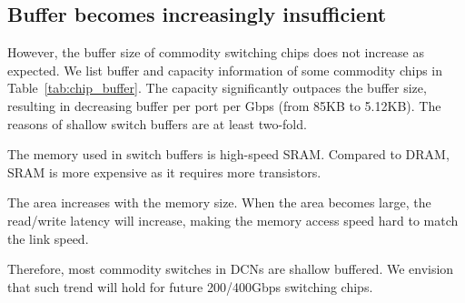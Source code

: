 \subsection{Buffer becomes increasingly insufficient}\label{sec:buffersize}
However, the buffer size of commodity switching chips does not increase as expected. We list buffer and capacity information of some commodity chips in Table~\ref{tab:chip_buffer}. The capacity significantly outpaces the buffer size, resulting in decreasing buffer per port per Gbps (from 85KB to 5.12KB). The reasons of shallow switch buffers are at least two-fold.
\begin{ecompact}
\item The memory used in switch buffers is high-speed SRAM. Compared to DRAM, SRAM is more expensive as it requires more transistors.
\vspace{-1mm}
\item The area increases with the memory size. When the area becomes large, the read/write latency will increase, making the memory access speed hard to match the link speed.
\end{ecompact}
Therefore, most commodity switches in DCNs are shallow buffered. We envision that such trend will hold for future 200/400Gbps switching chips.
